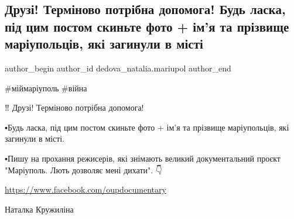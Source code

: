  
 
 
 
 

\subsection{Друзі! Терміново потрібна допомога! Будь ласка, під цим постом скиньте фото + ім'я та прізвище маріупольців, які загинули в місті}
\label{sec:10_01_2023.fb.dedova_natalia.mariupol.1.druz__term_novo_pot}

\ifcmt
 author_begin
   author_id dedova_natalia.mariupol
 author_end
\fi

\#міймаріуполь \#війна

‼️ Друзі! Терміново потрібна допомога! 🙏

▪️Будь ласка, під цим постом скиньте фото + ім'я та прізвище маріупольців, які загинули в місті. 

▪️Пишу на прохання режисерів, які знімають великий документальний проєкт "Маріуполь. Лють дозволяє мені дихати". 👇

\url{https://www.facebook.com/oupdocumentary}

Наталка Кружиліна

💙💛
